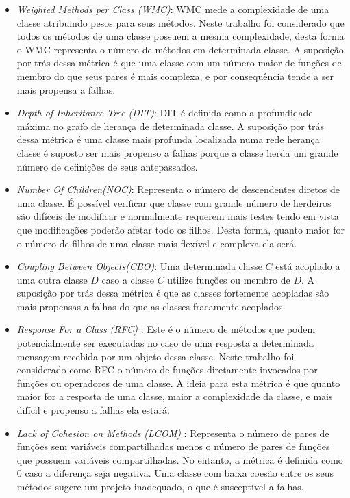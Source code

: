 \documentclass[12pt]{article}
\begin{document}
\begin{itemize}
	\item \textit{Weighted Methods per Class (WMC)}:  WMC mede a complexidade de uma classe atribuindo pesos para seus métodos. Neste trabalho foi considerado que todos os métodos de uma classe possuem a mesma complexidade, desta forma o WMC representa o número de métodos em determinada classe. A suposição por trás dessa métrica é que uma classe com um número maior de funções de membro do que seus pares é mais complexa, e por consequência tende a ser mais propensa a falhas.
	\item \textit{Depth of Inheritance Tree (DIT)}:  DIT é definida como a profundidade máxima no grafo de herança de determinada classe. A suposição por trás dessa métrica é uma classe mais profunda localizada numa rede herança classe é suposto ser mais propenso a falhas porque a classe herda um grande número de definições de seus antepassados.
	\item \textit{Number Of Children(NOC)}: Representa o número de descendentes diretos de uma classe. É possível verificar que classe com grande número de herdeiros são difíceis de modificar e normalmente requerem mais testes tendo em vista que modificações poderão afetar todo os filhos. Desta forma, quanto maior for o número de filhos de uma classe mais flexível e complexa ela será.
	\item \textit{Coupling Between Objects(CBO)}: Uma determinada classe $C$ está acoplado a uma outra classe $D$ caso a classe $C$ utilize funções ou membro de $D$. A suposição por trás dessa métrica é que as classes fortemente acopladas são mais propensas a falhas do que as classes fracamente acoplados.
	
	\item \textit{Response For a Class (RFC)} :  Este é o número de métodos que podem potencialmente ser executadas no caso de uma resposta a determinada mensagem recebida por um objeto dessa classe. Neste trabalho foi considerado como RFC o número de funções diretamente invocados por funções ou operadores de uma classe. A ideia para esta métrica é que quanto maior for a resposta de uma classe, maior a complexidade da classe, e mais difícil e propenso a falhas ela estará.
	
	\item \textit{Lack of Cohesion on Methods (LCOM)} : Representa o número de pares de funções sem variáveis compartilhadas menos o número de pares de funções que possuem variáveis compartilhadas. No entanto, a métrica é definida como 0 caso a diferença seja negativa. Uma classe com baixa coesão entre os seus métodos sugere um projeto inadequado, o que é susceptível a falhas.
	
\end{itemize}
\end{document}
